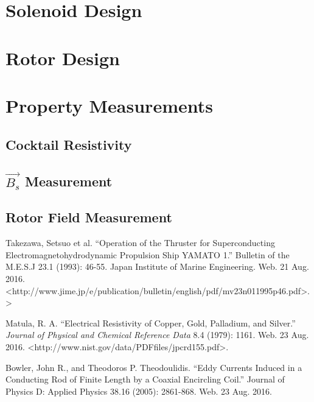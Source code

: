 \documentclass[]{article}
\begin{document}
\section{Solenoid Design}
\section{Rotor Design}

\section{Property Measurements}
\subsection{Cocktail Resistivity}
\label{sec:resistivity}
\subsection{$\vec{B_s}$ Measurement}
\subsection{Rotor Field Measurement}



\begin{thebibliography}{3}
	Takezawa, Setsuo et al. ``Operation of the Thruster for Superconducting Electromagnetohydrodynamic Propulsion Ship YAMATO 1.'' Bulletin of the M.E.S.J 23.1 (1993): 46-55. Japan Institute of Marine Engineering. Web. 21 Aug. 2016. \textless http://www.jime.jp/e/publication/bulletin/english/pdf/mv23n011995p46.pdf>.\textgreater
	
	Matula, R. A. ``Electrical Resistivity of Copper, Gold, Palladium, and Silver.'' \textit{Journal of Physical and Chemical Reference Data} 8.4 (1979): 1161. Web. 23 Aug. 2016. \textless http://www.nist.gov/data/PDFfiles/jpcrd155.pdf\textgreater. 
	
	Bowler, John R., and Theodoros P. Theodoulidis. ``Eddy Currents Induced in a Conducting Rod of Finite Length by a Coaxial Encircling Coil.'' Journal of Physics D: Applied Physics 38.16 (2005): 2861-868. Web. 23 Aug. 2016. 
\end{thebibliography}
\end{document}
